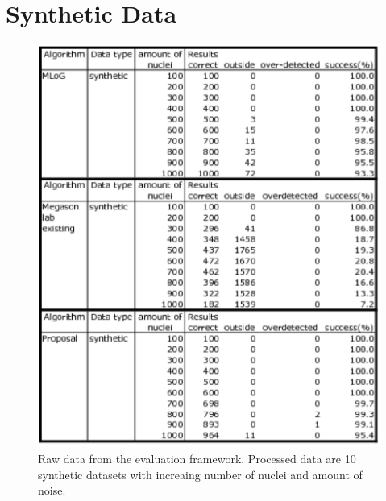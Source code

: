 \section{Synthetic Data}
\begin{figure}[H]
  \centering
  \includegraphics[width=1\textwidth]{pictures/evalTest}          
  \caption{Raw data from the evaluation framework. Processed data are 10 synthetic datasets with increaing number of nuclei and amount of noise.}
  \label{tab:syntheEvalRaw}
\end{figure}


